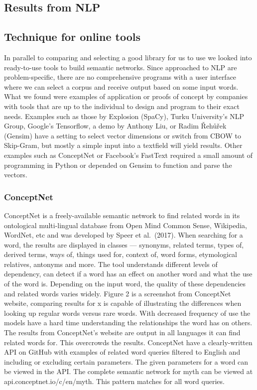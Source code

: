\documentclass[12pt, usenames, dvipsnames]{report}
\begin{document}
\begin{flushleft}

\chapter{Results from NLP}
\section{Technique for online tools}

In parallel to comparing and selecting a good library for us to use we looked into ready-to-use tools to build semantic networks.
Since approached to NLP are problem-specific, there are no comprehensive programs with a user interface where we can select a corpus and receive output based on some input words. 
What we found were examples of application or proofs of concept by companies with tools that are up to the individual to design and program to their exact needs.
Examples such as those by Explosion (SpaCy), Turku University’s NLP Group, Google’s Tensorflow, a demo by Anthony Liu, or Radim Řehůřek (Gensim) have a setting to select vector dimensions or switch from CBOW to Skip-Gram, but mostly a simple input into a textfield will yield results.
Other examples such as ConceptNet or Facebook’s FastText required a small amount of programming in Python or depended on Gensim to function and parse the vectors.

\subsection{ConceptNet}

ConceptNet is a freely-available semantic network to find related words in its ontological multi-lingual database from Open Mind Common Sense, Wikipedia, WordNet, etc and was developed by Speer et al.\ (2017).
When searching for a word, the results are displayed in classes --- synonyms, related terms, types of, derived terms, ways of, things used for, context of, word forms, etymological relatives, antonyms and more.
The tool understands different levels of dependency, can detect if a word has an effect on another word and what the use of the word is.
Depending on the input word, the quality of these dependencies and related words varies widely.
Figure 2 is a screenshot from ConceptNet website, comparing results for x is capable of illustrating the differences when looking up regular words versus rare words.
With decreased frequency of use the models have a hard time understanding the relationships the word has on others.
The results from ConceptNet’s website are output in all languages it can find related words for.
This overcrowds the results.
ConceptNet have a clearly-written API on GitHub with examples of related word queries filtered to English and including or excluding certain parameters.
The given parameters for a word can be viewed in the API.
The complete semantic network for myth can be viewed at api.conceptnet.io/c/en/myth.
This pattern matches for all word queries.


\end{flushleft}
\end{document}

